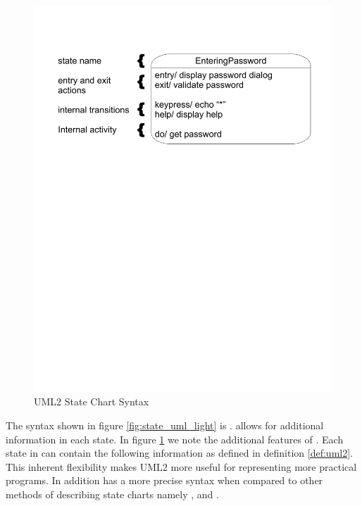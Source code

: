 \begin{figure}[htp]
    \centering
    \includegraphics[trim= 15mm 175mm 15mm 10mm, clip, width=\imgmedium]{./images/state_uml2_syntax_21_4.pdf} 
    \caption{UML2 State Chart Syntax \cite{UML2}}
    \label{fig:state_uml2}
\end{figure}

The syntax shown in figure \ref{fig:state_uml_light} is \cite{UML2}. \cite{UML2} allows for additional information in each state. In figure \ref{fig:state_uml2} we note the additional features of \cite{UML2}. Each state in \cite{UML2} can contain the following information as defined in definition \ref{def:uml2}. This inherent flexibility makes UML2 more useful for representing more practical programs. In addition \cite{UML2} has a more precise syntax when compared to other methods of describing state charts namely \cite{StateChartVis}, and \cite{UML2}.

